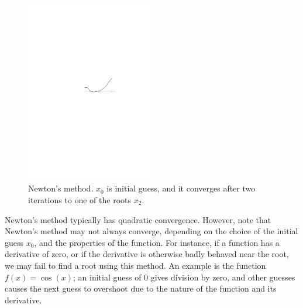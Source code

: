 \begin{figure}[ht]
\centering
\includegraphics[width=0.5\textwidth]{figure/newtonsmethod}
\caption{Newton's method. $x_0$ is initial guess, and it converges after two iterations to one of the roots $x_2$.}
\label{fig:newtons_method}
\end{figure}

Newton's method typically has quadratic convergence\cite{newton}. However, note that Newton's method may not always converge, depending on the choice of the initial guess $x_0$, and the properties of the function. For instance, if a function has a derivative of zero, or if the derivative is otherwise badly behaved near the root, we may fail to find a root using this method. An example is the function $f(x)=\cos(x)$; an initial guess of $0$ gives division by zero, and other guesses causes the next guess to overshoot due to the nature of the function and its derivative.

